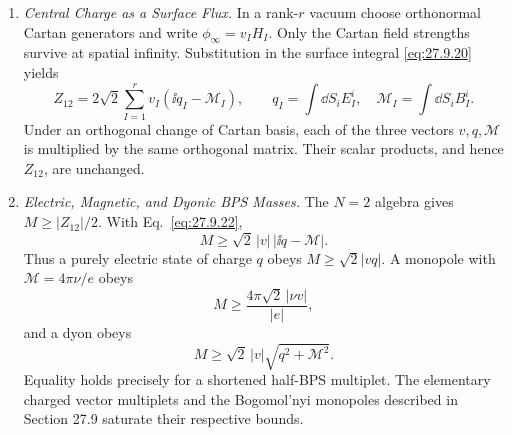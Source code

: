 \begin{enumerate}
  \begin{enumerate}
    \item \emph{Central Charge as a Surface Flux.}
    In a rank-\(r\) vacuum choose orthonormal Cartan generators and write
      \(\phi_\infty=v_IH_I\).  Only the Cartan field strengths survive at
      spatial infinity.  Substitution in the surface integral
      \eqref{eq:27.9.20} yields
      \[
        Z_{12}=2\sqrt2\sum_{I=1}^r
          v_I(\ii q_I-\mathcal M_I),\qquad
        q_I=\int \dd S_iE_I^i,\quad
        \mathcal M_I=\int \dd S_iB_I^i .
      \]
      Under an orthogonal change of Cartan basis, each of the three vectors
      \(v,q,\mathcal M\) is multiplied by the same orthogonal matrix.  Their
      scalar products, and hence \(Z_{12}\), are unchanged.
    \item \emph{Electric, Magnetic, and Dyonic BPS Masses.}
    The \(N=2\) algebra gives \(M\ge|Z_{12}|/2\).  With
      Eq.~\eqref{eq:27.9.22},
      \[
        M\ge\sqrt2\,|v|\,|\ii q-\mathcal M|.
      \]
      Thus a purely electric state of charge \(q\) obeys
      \(M\ge\sqrt2|vq|\).  A monopole with
      \(\mathcal M=4\pi\nu/e\) obeys
      \[
        M\ge\frac{4\pi\sqrt2\,|\nu v|}{|e|},
      \]
      and a dyon obeys
      \[
        M\ge\sqrt2\,|v|\sqrt{q^2+\mathcal M^2}.
      \]
      Equality holds precisely for a shortened half-BPS multiplet.  The
      elementary charged vector multiplets and the Bogomol'nyi monopoles
      described in Section 27.9 saturate their respective bounds.
  \end{enumerate}

\end{enumerate}
